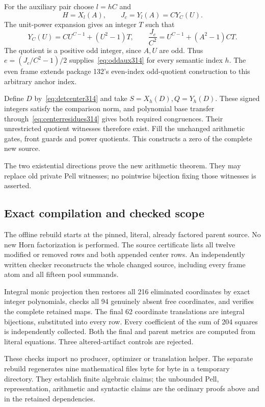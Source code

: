 For the auxiliary pair choose $l=hC$ and
\[
 H=X_l(A),\qquad J_c=Y_l(A)=C Y_C(U).
\]
The unit-power expansion gives an integer $T$ such that
\[
 Y_C(U)=CU^{C-1}+(U^2-1)T,
 \qquad
 \frac{J_c}{C^2}=U^{C-1}+(A^2-1)CT.
\]
The quotient is a positive odd integer, since $A,U$ are odd. Thus
$e=(J_c/C^2-1)/2$ supplies~\eqref{eq:oddaux314} for every semantic
index $h$. The even frame extends package 132's even-index odd-quotient
construction to this arbitrary anchor index.

Define $D$ by~\eqref{eq:detcenter314} and take
$S=X_h(D),Q=Y_h(D)$. These signed integers satisfy the comparison
norm, and polynomial base transfer through~\eqref{eq:centerresidues314}
gives both required congruences. Their unrestricted quotient witnesses
therefore exist. Fill the unchanged arithmetic gates, front guards and
power quotients. This constructs a zero of the complete new source.

The two existential directions prove the new arithmetic theorem. They
may replace old private Pell witnesses; no pointwise bijection fixing
those witnesses is asserted.

\subsection{Exact compilation and checked scope}

The offline rebuild starts at the pinned, literal, already factored parent
source. No new Horn factorization is performed. The source certificate
lists all twelve modified or removed rows and both appended center rows.
An independently written checker reconstructs the whole changed source,
including every frame atom and all fifteen pool summands.

Integral monic projection then restores all 216 eliminated coordinates
by exact integer polynomials, checks all 94 genuinely absent free
coordinates, and verifies the complete retained maps. The final 62
coordinate translations are integral bijections, substituted into every
row. Every coefficient of the sum of 204 squares is independently
collected. Both the final and parent metrics are computed from literal
equations. Three altered-artifact controls are rejected.

These checks import no producer, optimizer or translation helper. The
separate rebuild regenerates nine mathematical files byte for byte in a
temporary directory. They establish finite algebraic claims; the
unbounded Pell, representation, arithmetic and syntactic claims are
the ordinary proofs above and in the retained dependencies.
